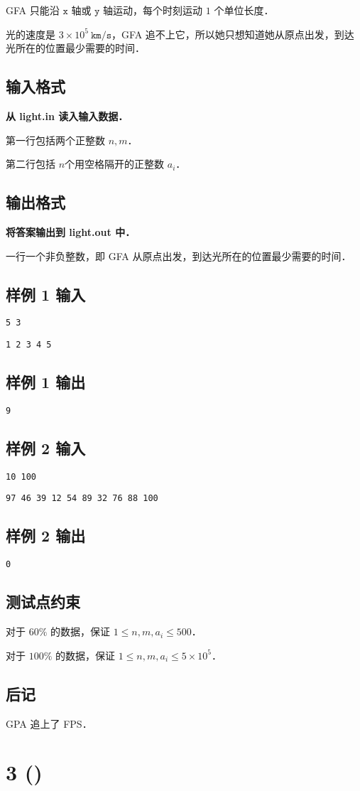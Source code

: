 	GFA 只能沿 $\texttt{x}$ 轴或 $\texttt{y}$ 轴运动，每个时刻运动 $1$ 个单位长度．
	
	光的速度是 $3 \times 10^5\ \texttt{km/s}$，GFA 追不上它，所以她只想知道她从原点出发，到达光所在的位置最少需要的时间．
	
	\subsection*{输入格式}
	\textbf{从 light.in 读入输入数据．}
	
	第一行包括两个正整数 $n,m$．

	第二行包括 $n$个用空格隔开的正整数 $a_i$．
	\subsection*{输出格式}
	\textbf{将答案输出到 light.out 中．}
	
	一行一个非负整数，即 GFA 从原点出发，到达光所在的位置最少需要的时间．
	\newpage
	\subsection*{样例 1 输入}
	\texttt{5 3}
	
	\texttt{1 2 3 4 5}
	\subsection*{样例 1 输出}
	\texttt{9}
	\subsection*{样例 2 输入}
	\texttt{10 100}
	
	\texttt{97 46 39 12 54 89 32 76 88 100}
	\subsection*{样例 2 输出}
	\texttt{0}
	\subsection*{测试点约束}
	
	对于 $60\%$ 的数据，保证 $1 \le n,m,a_i \le 500$．
	
	对于 $100\%$ 的数据，保证 $1 \le n,m,a_i \le 5 \times 10^5$．
	\subsection*{后记}
	GPA 追上了 FPS．
	\newpage
	\section*{3  ()}
